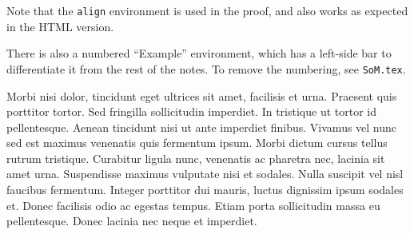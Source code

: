 Note that the \verb|align| environment is used in the proof, and also works as expected in the HTML version.

There is also a numbered ``Example'' environment, which has a left-side bar to differentiate it from the rest of the notes. To remove the numbering, see \verb|SoM.tex|.

\begin{example}

Morbi nisi dolor, tincidunt eget ultrices sit amet, facilisis et urna. Praesent quis porttitor tortor. Sed fringilla sollicitudin imperdiet. In tristique ut tortor id pellentesque. Aenean tincidunt nisi ut ante imperdiet finibus. Vivamus vel nunc sed est maximus venenatis quis fermentum ipsum. Morbi dictum cursus tellus rutrum tristique. Curabitur ligula nunc, venenatis ac pharetra nec, lacinia sit amet urna. Suspendisse maximus vulputate nisi et sodales. Nulla suscipit vel nisl faucibus fermentum. Integer porttitor dui mauris, luctus dignissim ipsum sodales et. Donec facilisis odio ac egestas tempus. Etiam porta sollicitudin massa eu pellentesque. Donec lacinia nec neque et imperdiet.


\end{example}
